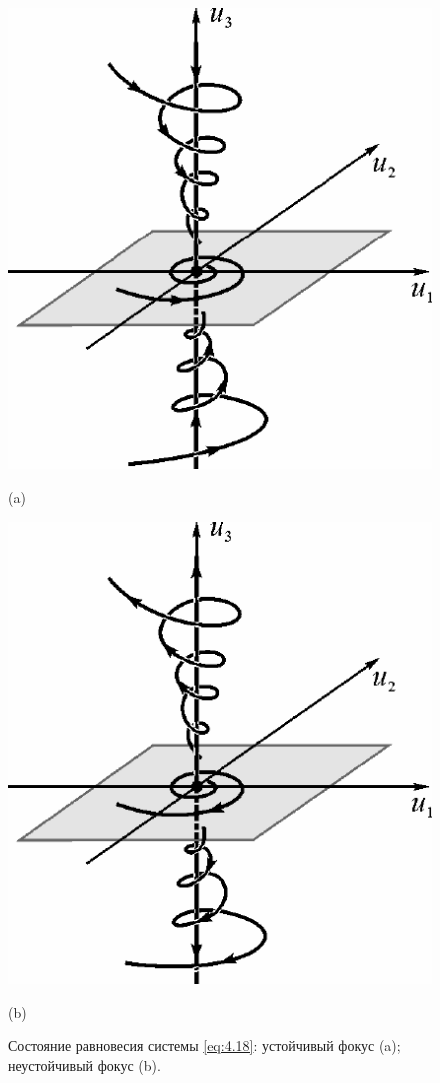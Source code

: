 \begin{figure}[h!]
        \centering
        \begin{minipage}{0.45\linewidth}
                \centering  
                \includegraphics[]{fig/lect4/4a}

                (a)
        \end{minipage}
        \begin{minipage}{0.45\linewidth}
                \centering  
                \includegraphics[]{fig/lect4/4b}

                (b)      
        \end{minipage}
        \caption{Состояние равновесия системы \eqref{eq:4.18}: устойчивый фокус (a); 
        неустойчивый фокус (b).}
        \label{fig:4.4}
\end{figure}

